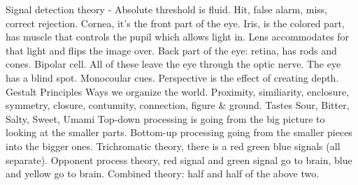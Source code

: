 \markdownRendererUlItem Signal detection theory - Absolute threshold is fluid. Hit, false alarm, miss, correct rejection.\markdownRendererUlItemEnd 
\markdownRendererUlEnd \markdownRendererInterblockSeparator
{}\markdownRendererInterblockSeparator
{}\markdownRendererUlBeginTight
\markdownRendererUlItem Cornea, it's the front part of the eye.\markdownRendererUlItemEnd 
\markdownRendererUlItem Iris, is the colored part, has muscle that controls the pupil which allows light in.\markdownRendererUlItemEnd 
\markdownRendererUlItem Lens accommodates for that light and flips the image over.\markdownRendererUlItemEnd 
\markdownRendererUlItem Back part of the eye: retina, has rods and cones.\markdownRendererUlItemEnd 
\markdownRendererUlItem Bipolar cell.\markdownRendererUlItemEnd 
\markdownRendererUlItem All of these leave the eye through the optic nerve. The eye has a blind spot.\markdownRendererUlItemEnd 
\markdownRendererUlItem Monocoular cues.\markdownRendererInterblockSeparator
{}\markdownRendererUlBeginTight
\markdownRendererUlItem Perspective is the effect of creating depth.\markdownRendererUlItemEnd 
\markdownRendererUlEndTight \markdownRendererUlItemEnd 
\markdownRendererUlItem Gestalt Principles\markdownRendererInterblockSeparator
{}\markdownRendererUlBeginTight
\markdownRendererUlItem Ways we organize the world.\markdownRendererUlItemEnd 
\markdownRendererUlItem Proximity, similiarity, enclosure, symmetry, closure, contunuity, connection, figure & ground.\markdownRendererUlItemEnd 
\markdownRendererUlEndTight \markdownRendererUlItemEnd 
\markdownRendererUlItem Tastes\markdownRendererInterblockSeparator
{}\markdownRendererUlBeginTight
\markdownRendererUlItem Sour, Bitter, Salty, Sweet, Umami\markdownRendererUlItemEnd 
\markdownRendererUlEndTight \markdownRendererUlItemEnd 
\markdownRendererUlItem Top-down processing is going from the big picture to looking at the smaller parts.\markdownRendererUlItemEnd 
\markdownRendererUlItem Bottom-up processing going from the smaller pieces into the bigger ones.\markdownRendererUlItemEnd 
\markdownRendererUlEndTight \markdownRendererInterblockSeparator
{}\markdownRendererInterblockSeparator
{}\markdownRendererUlBeginTight
\markdownRendererUlItem Trichromatic theory, there is a red green blue signals (all separate).\markdownRendererUlItemEnd 
\markdownRendererUlItem Opponent process theory, red signal and green signal go to brain, blue and yellow go to brain.\markdownRendererUlItemEnd 
\markdownRendererUlItem Combined theory: half and half of the above two.\markdownRendererUlItemEnd 
